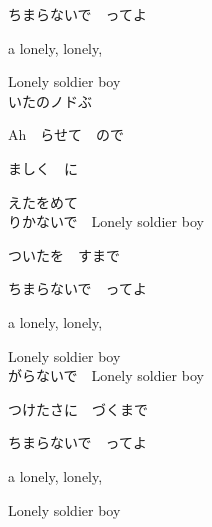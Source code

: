{ちまらないで　ってよ

a lonely, lonely,

Lonely soldier boy
\\

いたのノドぶ

Ah　らせて　ので

ましく　に

えたをめて
\\

りかないで　Lonely soldier boy

ついたを　すまで

ちまらないで　ってよ

a lonely, lonely,

Lonely soldier boy
\\

がらないで　Lonely soldier boy

つけたさに　づくまで

ちまらないで　ってよ

a lonely, lonely,

Lonely soldier boy

}